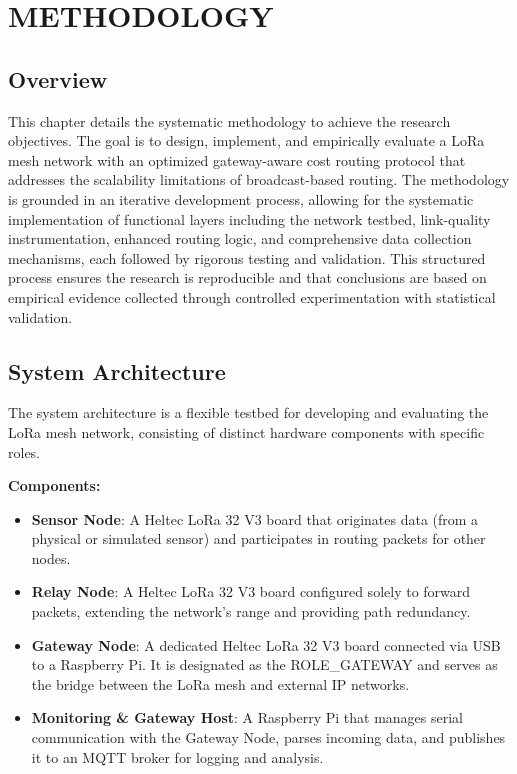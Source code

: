 \setlength{\parindent}{0in}
\setlength{\parskip}{0mm}
\setlength{\baselineskip}{1.6em}

\chapter{METHODOLOGY}
\label{chap:methodology}

\section{Overview}

This chapter details the systematic methodology to achieve the research objectives. The goal is to design, implement, and empirically evaluate a LoRa mesh network with an optimized gateway-aware cost routing protocol that addresses the scalability limitations of broadcast-based routing. The methodology is grounded in an iterative development process, allowing for the systematic implementation of functional layers including the network testbed, link-quality instrumentation, enhanced routing logic, and comprehensive data collection mechanisms, each followed by rigorous testing and validation. This structured process ensures the research is reproducible and that conclusions are based on empirical evidence collected through controlled experimentation with statistical validation.

\section{System Architecture}

The system architecture is a flexible testbed for developing and evaluating the LoRa mesh network, consisting of distinct hardware components with specific roles.

\textbf{Components:}

\begin{itemize}
\item \textbf{Sensor Node}: A Heltec LoRa 32 V3 board that originates data (from a physical or simulated sensor) and participates in routing packets for other nodes.

\item \textbf{Relay Node}: A Heltec LoRa 32 V3 board configured solely to forward packets, extending the network's range and providing path redundancy.

\item \textbf{Gateway Node}: A dedicated Heltec LoRa 32 V3 board connected via USB to a Raspberry Pi. It is designated as the ROLE\_GATEWAY and serves as the bridge between the LoRa mesh and external IP networks.

\item \textbf{Monitoring \& Gateway Host}: A Raspberry Pi that manages serial communication with the Gateway Node, parses incoming data, and publishes it to an MQTT broker for logging and analysis.
\end{itemize}

